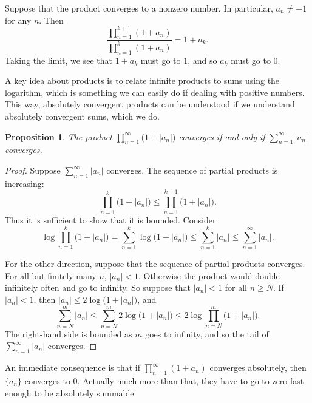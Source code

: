 \documentclass[12pt,openany]{book}
\newcommand{\sabs}[1]{\lvert {#1} \rvert}
\theoremstyle{plain}
\newtheorem{prop}[thm]{Proposition}
\theoremstyle{remark}
\theoremstyle{definition}
\theoremstyle{exercise}
\theoremstyle{example}
\begin{document}
Suppose that the product converges to a nonzero number.
In particular, $a_n \not= -1$ for any $n$.  Then
\begin{equation*}
\frac{
\prod_{n=1}^{k+1} (1+a_n)
}{
\prod_{n=1}^{k} (1+a_n)
}
=1+a_k .
\end{equation*}
Taking the limit, we see that $1+a_k$ must go to $1$,
and so $a_k$ must go to $0$.

A key idea about products is to relate infinite products to sums using the
logarithm, which is something we can easily do if dealing with positive
numbers.  This way, absolutely convergent products can be understood
if we understand absolutely convergent sums, which we do.

\begin{prop} \label{prop:infprodabsconvinfsum}
The product $\prod_{n=1}^\infty \bigl(1+\sabs{a_n}\bigr)$ converges if and only if
$\sum_{n=1}^\infty \sabs{a_n}$ converges.
\end{prop}

\begin{proof}
Suppose $\sum_{n=1}^\infty \sabs{a_n}$ converges.
The sequence of partial products is increasing:
\begin{equation*}
\prod_{n=1}^k \bigl(1+\sabs{a_n}\bigr) \leq
\prod_{n=1}^{k+1} \bigl(1+\sabs{a_n}\bigr) .
\end{equation*}
Thus it is sufficient to show that it is bounded.
Consider
\begin{equation*}
\log \prod_{n=1}^k \bigl(1+\sabs{a_n}\bigr)
=
\sum_{n=1}^k \log \bigl(1+\sabs{a_n}\bigr)
\leq
\sum_{n=1}^k \sabs{a_n} \leq
\sum_{n=1}^\infty \sabs{a_n} .
\end{equation*}

For the other direction, suppose that the sequence of partial products
converges.  For all but finitely many $n$, $\sabs{a_n} < 1$.
Otherwise the product would double infinitely often and go to
infinity.  So suppose that $\sabs{a_n} < 1$ for all $n \geq N$.
If $\sabs{a_n} < 1$, then $\sabs{a_n} \leq 2 \log \bigl(1+\sabs{a_n}\bigr)$,
and
\begin{equation*}
\sum_{n=N}^m \sabs{a_n}
\leq
\sum_{n=N}^m 2 \log \bigl(1+\sabs{a_n}\bigr)
\leq
2 \log \prod_{n=N}^m \bigl(1+\sabs{a_n}\bigr) .
\end{equation*}
The right-hand side is bounded as $m$ goes to infinity, and so the tail of
$\sum_{n=1}^\infty \sabs{a_n}$ converges.
\end{proof}

An immediate consequence is that if 
$\prod_{n=1}^\infty (1+a_n)$ converges absolutely, then
$\{ a_n \}$ converges to $0$.  Actually much more than that, they have to
go to zero fast enough to be absolutely summable.
\end{document}
